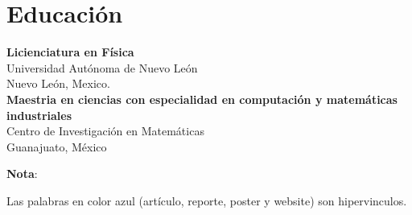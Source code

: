 \documentclass[a3paper]{adcv_color}
\begin{document}

\section{Educación}

\textbf{Licienciatura en Física} \\
Universidad Autónoma de Nuevo León\\
Nuevo León, Mexico.\\

\textbf{Maestria en ciencias con especialidad en computación y matemáticas industriales}\\
Centro de Investigación en Matemáticas\\
Guanajuato, México
\begin{flushright}
	\changefontsizes{10pt}
	\textbf{Nota}:

	Las palabras en color azul (artículo, reporte, poster y website) son hipervinculos.
\end{flushright}
\end{document}

